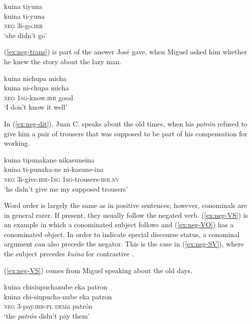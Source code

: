 \ea\label{ex:neg-act}
\begingl
\glpreamble kuina tiyuna\\
\gla kuina ti-yuna\\
\glb \textsc{neg} 3i-go.\textsc{irr}\\
\glft ‘she didn’t go’
\endgl
\trailingcitation{[jxx-p110923l-1.312]}
\xe

(\ref{ex:neg-trans}) is part of the answer José gave, when Miguel asked him whether he knew the story about the lazy man.

\ea\label{ex:neg-trans}
\begingl
\glpreamble kuina nichupa micha\\
\gla kuina ni-chupa micha\\
\glb \textsc{neg} 1\textsc{sg}-know.\textsc{irr} good\\
\glft ‘I don’t know it well’
\endgl
\trailingcitation{[mox-n110920l.007]}
\xe

In (\ref{ex:neg-dit}), Juan C. speaks about the old times, when his \textit{patrón} refused to give him a pair of trousers that was supposed to be part of his compensation for working.

\ea\label{ex:neg-dit}
\begingl 
\glpreamble kuina tipunakane nikasuneina\\
\gla kuina ti-punaka-ne ni-kasune-ina\\ 
\glb \textsc{neg} 3i-give.\textsc{irr}-1\textsc{sg} 1\textsc{sg}-trousers-\textsc{irr.nv}\\ 
\glft ‘he didn’t give me my supposed trousers’\\ 
\endgl
\trailingcitation{[mqx-p110826l.458]}
\xe

Word order is largely the same as in positive sentences; however, conominals are in general rarer. If present, they usually follow the negated verb. (\ref{ex:neg-VS}) is an example in which a conominated subject follows and (\ref{ex:neg-VO}) has a conominated object. In order to indicate special discourse status, a conominal argument can also precede the negator. This is the case in (\ref{ex:neg-SV}), where the subject precedes \textit{kuina} for contrastive .

(\ref{ex:neg-VS}) comes from Miguel speaking about the old days.

\ea\label{ex:neg-VS}
\begingl
\glpreamble kuina chisiupuchanube eka patron\\
\gla  kuina chi-siupucha-nube eka patron\\
\glb \textsc{neg} 3-pay.\textsc{irr}-\textsc{pl} \textsc{dem}a patrón\\
\glft ‘the \textit{patrón} didn’t pay them’
\endgl
\trailingcitation{[mxx-p110825l.042]}
\xe

